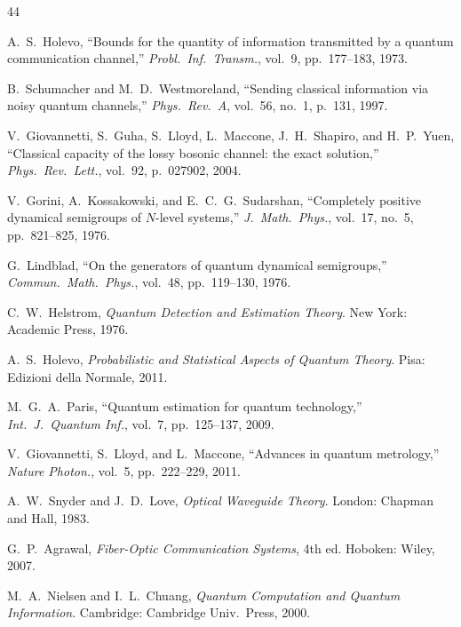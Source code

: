 \documentclass[journal,twocolumn]{IEEEtran}
\theoremstyle{definition}
\theoremstyle{plain}
\begin{document}
\begin{thebibliography}{44}


A.~S.~Holevo, ``Bounds for the quantity of information transmitted by
a quantum communication channel,'' \emph{Probl.\ Inf.\ Transm.},
vol.~9, pp.~177--183, 1973.

B.~Schumacher and M.~D.~Westmoreland, ``Sending classical information
via noisy quantum channels,'' \emph{Phys.\ Rev.\ A}, vol.~56, no.~1,
p.~131, 1997.

V.~Giovannetti, S.~Guha, S.~Lloyd, L.~Maccone, J.~H.~Shapiro, and
H.~P.~Yuen, ``Classical capacity of the lossy bosonic channel: the
exact solution,'' \emph{Phys.\ Rev.\ Lett.}, vol.~92, p.~027902, 2004.

V.~Gorini, A.~Kossakowski, and E.~C.~G.~Sudarshan, ``Completely
positive dynamical semigroups of $N$-level systems,''
\emph{J.\ Math.\ Phys.}, vol.~17, no.~5, pp.~821--825, 1976.

G.~Lindblad, ``On the generators of quantum dynamical semigroups,''
\emph{Commun.\ Math.\ Phys.}, vol.~48, pp.~119--130, 1976.

C.~W.~Helstrom, \emph{Quantum Detection and Estimation Theory}.
New York: Academic Press, 1976.

A.~S.~Holevo, \emph{Probabilistic and Statistical Aspects of Quantum
Theory}. Pisa: Edizioni della Normale, 2011.

M.~G.~A.~Paris, ``Quantum estimation for quantum technology,''
\emph{Int.\ J.\ Quantum Inf.}, vol.~7, pp.~125--137, 2009.

V.~Giovannetti, S.~Lloyd, and L.~Maccone, ``Advances in quantum
metrology,'' \emph{Nature Photon.}, vol.~5, pp.~222--229, 2011.

A.~W.~Snyder and J.~D.~Love, \emph{Optical Waveguide Theory}.
London: Chapman and Hall, 1983.

G.~P.~Agrawal, \emph{Fiber-Optic Communication Systems}, 4th ed.
Hoboken: Wiley, 2007.

M.~A.~Nielsen and I.~L.~Chuang,
\emph{Quantum Computation and Quantum Information}.
Cambridge: Cambridge Univ.\ Press, 2000.


\end{thebibliography}
\end{document}
